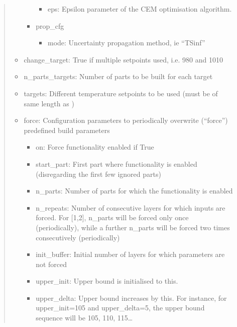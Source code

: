 \documentclass[letterpaper,10pt,english,openany,oneside]{sphinxmanual}
\begin{document}
\begin{itemize}
\begin{quote}
\begin{itemize}
\begin{itemize}
\begin{itemize}
\item {} 
eps: Epsilon parameter of the CEM optimisation algorithm.

\end{itemize}

\item {} 
prop\_cfg
\begin{itemize}
\item {} 
mode: Uncertainty propagation method, ie “TSinf”

\end{itemize}

\end{itemize}

\item {} 
change\_target: True if multiple setpoints used, i.e. 980 and 1010

\item {} 
n\_parts\_targets: Number of parts to be built for each target

\item {} 
targets: Different temperature setpoints to be used (must be of same length as )

\item {} 
force: Configuration parameters to periodically overwrite (“force”) predefined build parameters
\begin{itemize}
\item {} 
on: Force functionality enabled if True

\item {} 
start\_part: First part where functionality is enabled (disregarding the first few ignored parts)

\item {} 
n\_parts: Number of parts for which the functionality is enabled

\item {} 
n\_repeats: Number of consecutive layers for which inputs are forced. For {[}1,2{]}, n\_parts will be forced only once (periodically), while a further n\_parts will be forced two times consecutively (periodically)

\item {} 
init\_buffer: Initial number of layers for which parameters are not forced

\item {} 
upper\_init: Upper bound is initialised to this.

\item {} 
upper\_delta: Upper bound increases by this. For instance, for upper\_init=105 and upper\_delta=5, the upper bound sequence will be 105, 110, 115…


\end{itemize}
\end{itemize}
\end{quote}
\end{itemize}
\end{document}

